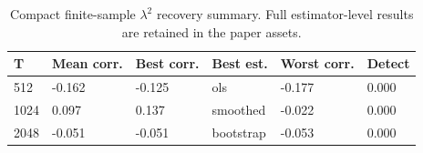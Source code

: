 \begin{table}[t]
\centering
\small
\caption{Compact finite-sample \(\lambda^2\) recovery summary. Full estimator-level results are retained in the paper assets.}
\label{tab:table3_finite_sample_lambda2_recovery}
\begin{tabular}{llllll}
\toprule
T & Mean corr. & Best corr. & Best est. & Worst corr. & Detect \\
\midrule
512 & -0.162 & -0.125 & ols & -0.177 & 0.000 \\
1024 & 0.097 & 0.137 & smoothed & -0.022 & 0.000 \\
2048 & -0.051 & -0.051 & bootstrap & -0.053 & 0.000 \\
\bottomrule
\end{tabular}
\end{table}
